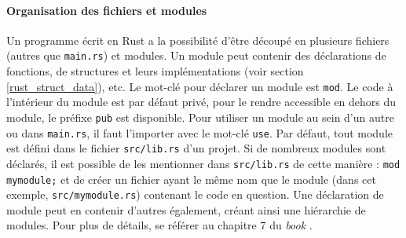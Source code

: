 \documentclass[a4paper, 12pt]{article}
\begin{document}
\paragraph{Organisation des fichiers et modules}
Un programme écrit en Rust a la possibilité d'être découpé en plusieurs fichiers (autres que 
\texttt{main.rs}) et modules. 
Un module peut contenir des déclarations de fonctions, de structures et leurs implémentations (voir 
section \ref{rust_struct_data}), etc. Le mot-clé pour déclarer un module est \texttt{mod}. 
Le code à l'intérieur du module est par défaut privé, pour le rendre accessible en dehors du module, 
le préfixe \texttt{pub} est disponible. Pour utiliser un module au sein d'un autre ou dans 
\texttt{main.rs}, il faut l'importer avec le mot-clé \texttt{use}. Par défaut, 
tout module est défini dans le fichier \texttt{src/lib.rs} d'un projet. Si de nombreux 
modules sont déclarés, il est possible de les mentionner dans \texttt{src/lib.rs} de cette 
manière : \texttt{mod mymodule;} et de créer un fichier ayant le même nom que le module 
(dans cet exemple, \texttt{src/mymodule.rs}) contenant le code en question. Une déclaration 
de module peut en contenir d'autres également, créant ainsi une hiérarchie de modules.
Pour plus de détails, se référer au chapitre 7 du \textit{book} \cite{ref0}.
\end{document}
